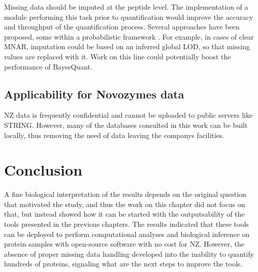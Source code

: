 Missing data should be imputed at the peptide level. The implementation of a module performing this task prior to quantification would  improve the accuracy and throughput of the quantification process. Several approaches have been proposed, some within a probabilistic framework \cite{Lazar2016}. For example, in cases of clear \ac{MNAR}, imputation could be based on an inferred global \ac{LOD}, so that missing values are replaced with it. Work on this line could potentially boost the performance of BayesQuant.


\subsection{Applicability for Novozymes data}

\ac{NZ} data is frequently confidential and cannot be uploaded to public servers like STRING. However, many of the databases consulted in this work can be built locally, thus removing the need of data leaving the company\textquotesingle s facilities.



\section{Conclusion}
A fine biological interpretation of the results depends on the original question that motivated the study, and thus the work on this chapter did not focus on that, but instead showed how it can be started with the outputsability of the tools presented in the previous chapters. The results indicated that these tools can be deployed to perform computational analyses and biological inference on protein samples with open-source software with no cost for \ac{NZ}. However, the absence of proper missing data handling developed into the inability to quantify hundreds of proteins, signaling what are the next steps to improve the tools. 
